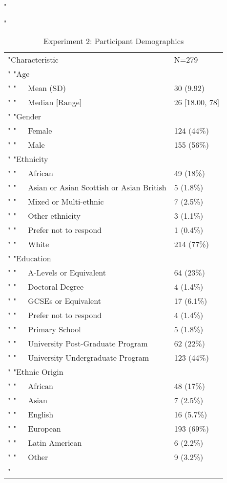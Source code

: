 \documentclass[
"  donotrepeattitle,doc, 12pt, a4paper,floatsintext]{apa7}"
\begin{document}
\begin{table}[h]
\begin{center}
\begin{threeparttable}
"\caption{\label{tab:Experiment 2: Participant Demographics}Experiment 2: Participant Demographics}"
\begin{tabular}{ll}
\toprule
"Characteristic & N=279\\"
\midrule
"Age & \\"
"\ \ \ Mean (SD) & 30 (9.92)\\"
"\ \ \ Median [Range] & 26 [18.00, 78]\\"
"Gender & \\"
"\ \ \ Female & 124 (44\%)\\"
"\ \ \ Male & 155 (56\%)\\"
"Ethnicity & \\"
"\ \ \ African & 49 (18\%)\\"
"\ \ \ Asian  or  Asian Scottish  or  Asian British & 5 (1.8\%)\\"
"\ \ \ Mixed  or  Multi-ethnic & 7 (2.5\%)\\"
"\ \ \ Other ethnicity & 3 (1.1\%)\\"
"\ \ \ Prefer not  to respond & 1 (0.4\%)\\"
"\ \ \ White & 214 (77\%)\\"
"Education & \\"
"\ \ \ A-Levels  or  Equivalent & 64 (23\%)\\"
"\ \ \ Doctoral  Degree & 4 (1.4\%)\\"
"\ \ \ GCSEs  or  Equivalent & 17 (6.1\%)\\"
"\ \ \ Prefer not  to respond & 4 (1.4\%)\\"
"\ \ \ Primary School & 5 (1.8\%)\\"
"\ \ \ University  Post-Graduate  Program & 62 (22\%)\\"
"\ \ \ University  Undergraduate  Program & 123 (44\%)\\"
"Ethnic Origin & \\"
"\ \ \ African & 48 (17\%)\\"
"\ \ \ Asian & 7 (2.5\%)\\"
"\ \ \ English & 16 (5.7\%)\\"
"\ \ \ European & 193 (69\%)\\"
"\ \ \ Latin American & 6 (2.2\%)\\"
"\ \ \ Other & 9 (3.2\%)\\"
\bottomrule
\end{tabular}
\end{threeparttable}
\end{center}
\end{table}
\end{document}
